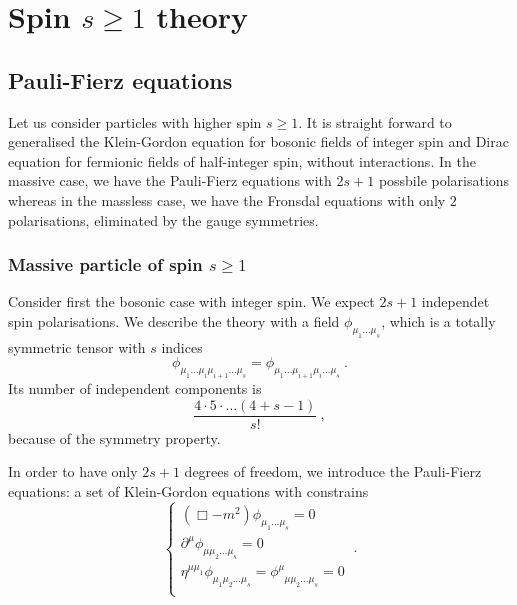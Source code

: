 \part{Spin $s \geq 1$ theory}

\chapter{Pauli-Fierz equations} 

    Let us consider particles with higher spin $s \geq 1$. It is straight forward to generalised the Klein-Gordon equation for bosonic fields of integer spin and Dirac equation for fermionic fields of half-integer spin, without interactions. In the massive case, we have the Pauli-Fierz equations with $2s+1$ possbile polarisations whereas in the massless case, we have the Fronsdal equations with only $2$ polarisations, eliminated by the gauge symmetries. 

\section{Massive particle of spin $s \geq 1$}

    Consider first the bosonic case with integer spin. We expect $2s+1$ independet spin polarisations. We describe the theory with a field $\phi_{\mu_1 \ldots \mu_s}$, which is a totally symmetric tensor with $s$ indices 
    \begin{equation*}
        \phi_{\mu_1 \ldots \mu_i \mu_{i+1} \ldots \mu_s} = \phi_{\mu_1 \ldots \mu_{i+1} \mu_i \ldots \mu_s} ~.
    \end{equation*}
    Its number of independent components is 
    \begin{equation*}
        \frac{4 \cdot 5 \cdot \ldots (4 + s - 1)}{s!} ~,
    \end{equation*}
    because of the symmetry property.

    In order to have only $2s+1$ degrees of freedom, we introduce the Pauli-Fierz equations: a set of Klein-Gordon equations with constrains
    \begin{equation}\label{pfeq}
        \begin{cases}
            (\Box - m^2) \phi_{\mu_1 \ldots \mu_s} = 0 \\
            \partial^\mu \phi_{\mu \mu_2 \ldots \mu_s} = 0 \\
            \eta^{\mu \mu_1} \phi_{\mu_1 \mu_2 \ldots \mu_s} = \phi^\mu_{\phantom \mu \mu \mu_2 \ldots \mu_s} = 0 \\
        \end{cases} ~.
    \end{equation}


